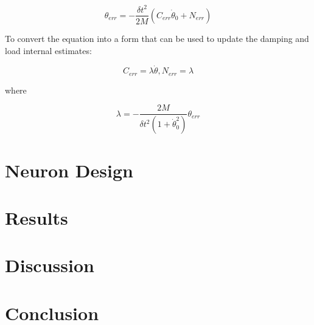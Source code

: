 \documentclass[letterpaper, 10 pt, conference]{IEEEconf} %
\newcommand{\bbs}[1]{\section{#1}}
\begin{document}
\begin{equation}
\theta_{err} = - \dfrac{\delta t^{2}}{2M}(C_{err} \dot{\theta}_{0} + N_{err})
\end{equation}

To convert the equation into a form that can be used to update the damping and
load internal estimates:

\begin{equation}
C_{err} = \lambda \dot{\theta}, N_{err} = \lambda
\end{equation}

where

\begin{equation}
\lambda 
=
- \dfrac{2M}{\delta t^{2} (1 + \dot{\theta}_{0}^{2})} \theta_{err}
\end{equation}

\bbs{Neuron Design}
\label{chap:neuron_design}


\bbs{Results}
\label{chap:results}

\bbs{Discussion}
\label{chap:discussion}

\bbs{Conclusion}
\label{chap:conclusion}

\newpage
\label{chap:references}
\printbibliography[heading=bibintoc, title={Bibliography}]
\end{document}
